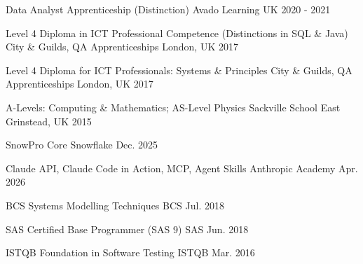 
\begin{cventries}

  \cventry
  {Data Analyst Apprenticeship (Distinction)} %
  {Avado Learning} %
  {UK} %
  {2020 - 2021}{} %

  \cventry
  {Level 4 Diploma in ICT Professional Competence (Distinctions in SQL \& Java)} %
  {City \& Guilds, QA Apprenticeships} %
  {London, UK} %
  {2017}{} %

  \cventry
  {Level 4 Diploma for ICT Professionals: Systems \& Principles} %
  {City \& Guilds, QA Apprenticeships} %
  {London, UK} %
  {2017}{} %

  \cventry
  {A-Levels: Computing \& Mathematics; AS-Level Physics} %
  {Sackville School} %
  {East Grinstead, UK} %
  {2015}{} %
\end{cventries}


\begin{cvhonors}

  \cvhonor
  {SnowPro Core} %
  {Snowflake} %
  {} %
  {Dec. 2025} %

  \cvhonor
  {Claude API, Claude Code in Action, MCP, Agent Skills} %
  {Anthropic Academy} %
  {} %
  {Apr. 2026} %

  \cvhonor
  {BCS Systems Modelling Techniques} %
  {BCS} %
  {} %
  {Jul. 2018} %

  \cvhonor
  {SAS Certified Base Programmer (SAS 9)} %
  {SAS} %
  {} %
  {Jun. 2018} %

  \cvhonor
  {ISTQB Foundation in Software Testing} %
  {ISTQB} %
  {} %
  {Mar. 2016} %
\end{cvhonors}
